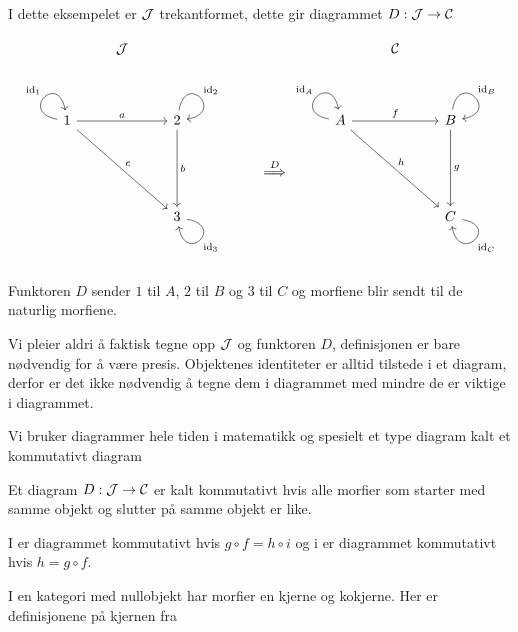 \begin{eksempel}\label{ex:Diag2}
  I dette eksempelet er $\mathcal{J}$ trekantformet, dette gir
  diagrammet $D:\mathcal{J}\to\mathcal{C}$

  \[\begin{tikzcd}
	& \Jcal &&&&& \Ccal \\
	\\
	1 && 2 &&& A && B \\
	&&&& {\stackrel{D}{\implies}} \\
	&& 3 &&&&& C
	\arrow["{\id_1}", from=3-1, to=3-1, loop, in=100, out=170, distance=10mm]
	\arrow["a", from=3-1, to=3-3]
	\arrow["c", from=3-1, to=5-3]
	\arrow["{\id_2}", from=3-3, to=3-3, loop, in=10, out=80, distance=10mm]
	\arrow["b", from=3-3, to=5-3]
	\arrow["{\id_A}", from=3-6, to=3-6, loop, in=100, out=170, distance=10mm]
	\arrow["f", from=3-6, to=3-8]
	\arrow["h", from=3-6, to=5-8]
	\arrow["{\id_B}", from=3-8, to=3-8, loop, in=10, out=80, distance=10mm]
	\arrow["g", from=3-8, to=5-8]
	\arrow["{\id_3}", from=5-3, to=5-3, loop, in=280, out=350, distance=10mm]
	\arrow["{\id_C}", from=5-8, to=5-8, loop, in=280, out=350, distance=10mm]
\end{tikzcd}\]

Funktoren $D$ sender $1$ til $A$, $2$ til $B$ og $3$ til $C$ og
  morfiene blir sendt til de naturlig morfiene.
\end{eksempel}
Vi pleier aldri å faktisk tegne opp $\mathcal{J}$ og funktoren $D$,
definisjonen er bare nødvendig for å være presis. Objektenes
identiteter er alltid tilstede i et diagram, derfor er det ikke nødvendig
å tegne dem i diagrammet med mindre de er viktige i diagrammet.

Vi bruker diagrammer hele tiden i matematikk og spesielt et type
diagram kalt et kommutativt diagram

\begin{definisjon}\label{def:KomDiag}
Et diagram $D:\mathcal{J}\to\mathcal{C}$ er kalt kommutativt hvis alle morfier
som starter med samme objekt og slutter på samme objekt er like.
\end{definisjon}

I  er diagrammet kommutativt hvis $g\circ
f = h\circ i$ og i  er diagrammet
kommutativt hvis $h=g\circ f$.


I en kategori med nullobjekt har morfier en kjerne og kokjerne. Her er definisjonene på kjernen fra \cite{MacLane}

